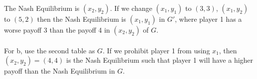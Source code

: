 \documentclass[a4paper,12pt]{article}
\newcommand{\NE}{Nash Equilibrium }
\begin{document}
\begin{enumerate}[a.]
\begin{comment}
\begin{figure}
\centering \subfigure[$G$]{\begin{tabular}{|c|c|c|}
  \hline
        & $y_1$ & $y_2$ \\
  \hline
  $x_1$ & (1,3) & (2,2) \\
  \hline
  $x_2$ & (2,2) & \textbf{(4,4)} \\
  \hline
\end{tabular}
}
 \subfigure{$\quad \Rightarrow \quad$}
\subfigure[$G'$]{\begin{tabular}{|c|c|c|}
  \hline
        & $y_1$ & $y_2$ \\
  \hline
  $x_1$ & \textbf{(3,3)} & (5,2) \\
  \hline
  $x_2$ & (2,2) & (4,4) \\
  \hline
\end{tabular}}
\end{figure}
\end{comment}

The \NE is $(x_2,y_2)$. If we change $(x_1,y_1)$ to $(3,3)$,
$(x_1,y_2)$ to $(5,2)$ then the \NE is $(x_1,y_1)$ in $G'$, where
player 1 has a worse payoff 3 than the payoff 4 in $(x_2,y_2)$
of $G$.\\\\
For b, use the second table as $G$. If we prohibit player 1 from
using $x_1$, then $(x_2,y_2)=(4,4)$ is the \NE such that player 1
will have a higher payoff than the \NE in $G$.
\end{enumerate}
\end{document}
